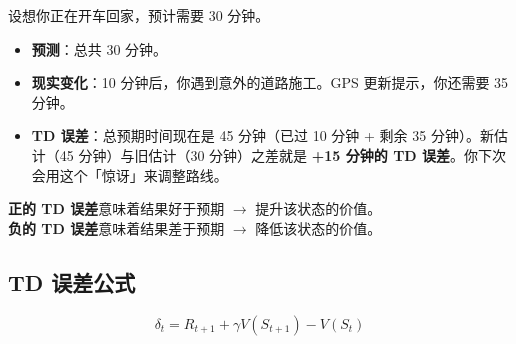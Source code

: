 \begin{examplebox}[直觉：开车类比]
设想你正在开车回家，预计需要 30 分钟。

\begin{itemize}
  \item \textbf{预测}：总共 30 分钟。
  \item \textbf{现实变化}：10 分钟后，你遇到意外的道路施工。GPS 更新提示，你还需要 35 分钟。
  \item \textbf{TD 误差}：总预期时间现在是 45 分钟（已过 10 分钟 + 剩余 35 分钟）。新估计（45 分钟）与旧估计（30 分钟）之差就是 \textbf{+15 分钟的 TD 误差}。你下次会用这个「惊讶」来调整路线。
\end{itemize}

\textbf{正的 TD 误差}意味着结果好于预期 $\rightarrow$ 提升该状态的价值。\\

\textbf{负的 TD 误差}意味着结果差于预期 $\rightarrow$ 降低该状态的价值。
\end{examplebox}

\subsection{TD 误差公式}
\label{the-td-error-formula}

\begin{equation}
\boxed{\delta_t = R_{t+1} + \gamma V(S_{t+1}) - V(S_t)}
\end{equation}

